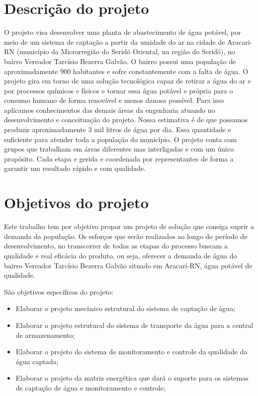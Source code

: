   \section{Descrição do projeto}
O projeto visa desenvolver uma planta de abastecimento de água potável, por meio de um sistema de captação a partir da umidade do ar na cidade de Aracari-RN (município da Microrregião do Seridó Oriental, na região do Seridó), no bairro Vereador Tarcísio Bezerra Galvão. O bairro possui uma população de aproximadamente 900 habitantes e sofre constantemente com a falta de água. 
O projeto gira em torno de uma solução tecnológica  capaz de retirar a água do ar e por processos químicos e físicos e tornar essa água potável e própria para o consumo humano de forma renovável e menos danosa possível. Para isso aplicamos conhecimentos das demais áreas da engenharia atuando no desenvolvimento e conceituação do projeto. Nossa estimativa é de que possamos produzir aproximadamente 3 mil litros de água por dia. Essa quantidade e suficiente para atender toda a população do município. 
O projeto conta com grupos que trabalham em áreas diferentes mas interligadas e com um único propósito. Cada etapa e gerida e coordenada por representantes de forma a garantir um resultado rápido e com qualidade.


\section{Objetivos do projeto}
  
  Este trabalho tem por objetivo propor um projeto de solução que consiga suprir a demanda da população. Os esforços que serão
realizados ao longo do período de desenvolvimento, no transcorrer de todas as etapas do processo buscam a qualidade e real
eficácia do produto, ou seja, oferecer a demanda de água do bairro Vereador Tarcísio Bezerra Galvão situado em Aracarí-RN, 
água potável de qualidade.

 São objetivos específicos do projeto:
 \begin{itemize}
  \item Elaborar o projeto mecânico estrutural do sistema de captação de água;
  \item Elaborar o projeto estrutural do sistema de transporte da água para a central de armazenamento;
  \item Elaborar o projeto do sistema de monitoramento e controle da qualidade da água captada;
  \item Elaborar o projeto da matriz energética que dará o suporte para os sistemas de captação de água e monitoramento e controle;
 \end{itemize}
  
